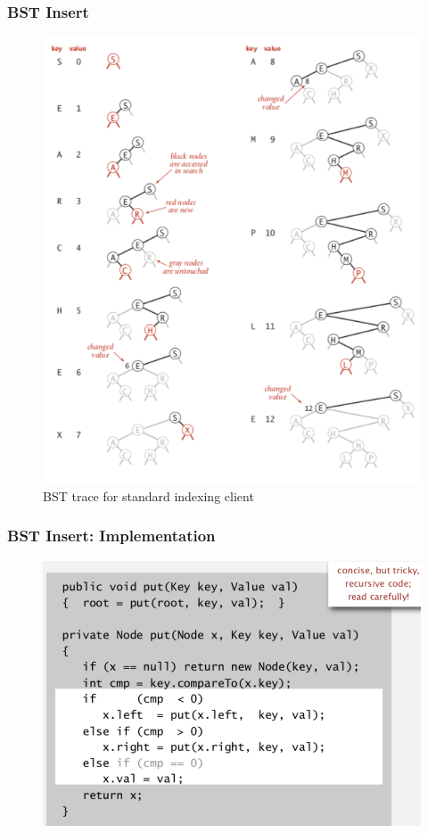 \documentclass[11pt]{beamer}
\begin{document}
    \begin{frame}[fragile]
    	\frametitle{BST Insert}
        \begin{figure}
        	\centering
        	\includegraphics[width=0.55\linewidth]{"Screenshot 2020-11-02 at 10.39.30 PM"}
        	\caption{BST trace for standard indexing client}
        	\label{fig:screenshot-2020-11-02-at-10}
        \end{figure}
        
    \end{frame}

      \begin{frame}[fragile]
    	\frametitle{BST Insert: Implementation}
    	\begin{figure}
    		\centering
    		\includegraphics[width=0.9\linewidth]{"Screenshot 2020-11-02 at 10.45.02 PM"}
    		\caption{}
    		\label{fig:screenshot-2020-11-02-at-10}
    	\end{figure}	
    \end{frame}
\end{document}
